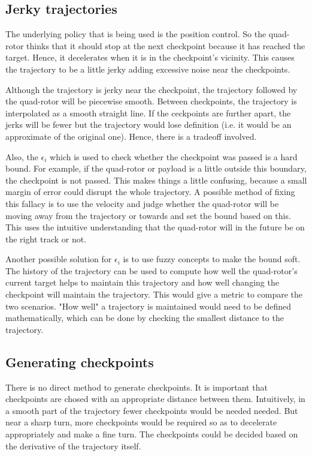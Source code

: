 \documentclass[hidelinks,BTech]{iitmdiss}
\begin{document}
\subsection{Jerky trajectories}
The underlying policy that is being used is the position control. So the quad-rotor thinks that it should stop at the next checkpoint because it has reached the target. Hence, it decelerates when it is in the checkpoint's vicinity. This causes the trajectory to be a little jerky adding excessive noise near the checkpoints.

Although the trajectory is jerky near the checkpoint, the trajectory followed by the quad-rotor will be piecewise smooth. Between checkpoints, the trajectory is interpolated as a smooth straight line. If the ceckpoints are further apart, the jerks will be fewer but the trajectory would lose definition (i.e. it would be an approximate of the original one). Hence, there is a tradeoff involved.

Also, the $\epsilon_i$ which is used to check whether the checkpoint was passed is a hard bound. For example, if the quad-rotor or payload is a little outside this boundary, the checkpoint is not passed. This makes things a little confusing, because a small margin of error could disrupt the whole trajectory. A possible method of fixing this fallacy is to use the velocity and judge whether the quad-rotor will be moving away from the trajectory or towards and set the bound based on this. This uses the intuitive understanding that the quad-rotor will in the future be on the right track or not.

Another possible solution for $\epsilon_i$ is to use fuzzy concepts to make the bound soft. The history of the trajectory can be used to compute how well the quad-rotor's current target helps to maintain this trajectory and how well changing the checkpoint will maintain the trajectory. This would give a metric to compare the two scenarios. "How well" a trajectory is maintained would need to be defined mathematically, which can be done by checking the smallest distance to the trajectory.

\subsection{Generating checkpoints}
There is no direct method to generate checkpoints. It is important that checkpoints are chosed with an appropriate distance between them. Intuitively, in a smooth part of the trajectory fewer checkpoints would be needed needed. But near a sharp turn, more checkpoints would be required so as to decelerate appropriately and make a fine turn. The checkpoints could be decided based on the derivative of the trajectory itself.
\end{document}
